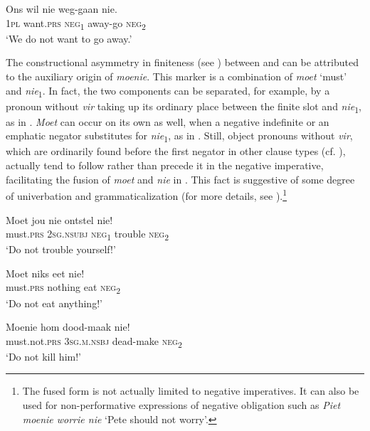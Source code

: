 \documentclass[output=paper,colorlinks,citecolor=brown]{langscibook}
\begin{document}
    \ex\label{ex:afr:11e}
        \gll Ons wil nie weg-gaan nie. \\
             \textsc{1pl}  want.\textsc{prs} \textsc{neg}\textsubscript{1} away-go    \textsc{neg}\textsubscript{2}\\
        \glt ‘We do not want to go away.’ 
    \z
\z 


The constructional asymmetry in finiteness (see \citealt[73--96]{Miestamo2005}) between  and  can be attributed to the auxiliary origin of \textit{moenie}. This marker is a combination of \textit{moet} ‘must’ and \textit{nie}\textsubscript{1}. In fact, the two components can be separated, for example, by a pronoun without \textit{vir} taking up its ordinary place between the finite slot and \textit{nie}\textsubscript{1}, as in . \textit{Moet} can occur on its own as well, when a negative indefinite or an emphatic negator substitutes for \textit{nie}\textsubscript{1}, as in . Still, object pronouns without \textit{vir}, which are ordinarily found before the first negator in other clause types (cf. ), actually tend to follow rather than precede it in the negative imperative, facilitating the fusion of \textit{moet} and \textit{nie} in . This fact is suggestive of some degree of univerbation and grammaticalization (for more details, see \citealt[500--501]{Olmen2010}).\footnote{The fused form is not actually limited to negative imperatives. It can also be used for non-performative expressions of negative obligation such as \textit{Piet moenie worrie nie} ‘Pete should not worry’.\label{footnote:afr:3}}

\ea\label{ex:afr:12}
    \ea\label{ex:afr:12a}
        \gll Moet jou nie ontstel nie! \\ 
             must.\textsc{prs} \textsc{2sg.nsubj} \textsc{neg}\textsubscript{1} trouble  \textsc{neg}\textsubscript{2}  \\
        \glt ‘Do not trouble yourself!’
    
    \ex\label{ex:afr:12b}
        \gll Moet niks eet nie! \\
             must.\textsc{prs} nothing eat    \textsc{neg}\textsubscript{2} \\
        \glt ‘Do not eat anything!’
        
    \ex\label{ex:afr:12c}
        \gll Moenie hom dood-maak nie! \\
             must.not.\textsc{prs} \textsc{3sg.m.nsbj} dead-make  \textsc{neg}\textsubscript{2}\\
        \glt ‘Do not kill him!’
    \z
\z 
\end{document}
